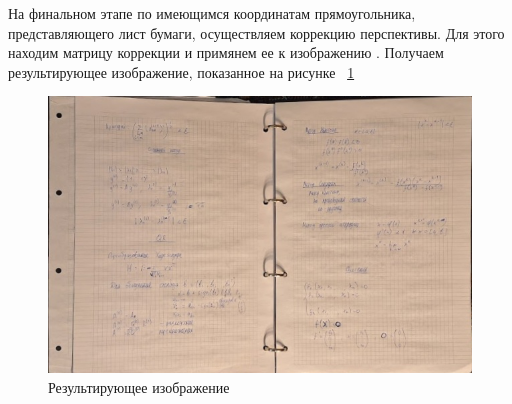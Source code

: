 На финальном этапе по имеющимся координатам прямоугольника, представляющего лист бумаги, осуществляем коррекцию перспективы. Для этого находим матрицу коррекции \cite{opencv_perspective_transform} и примянем ее к изображению \cite{opencv_warp_perspective}.
Получаем результирующее изображение, показанное на рисунке ~\ref{perspective_correction}
\begin{figure}
    \includegraphics[scale=0.25]{img/perspective_output}
    \caption{Результирующее изображение}
    \label{perspective_correction}
\end{figure}